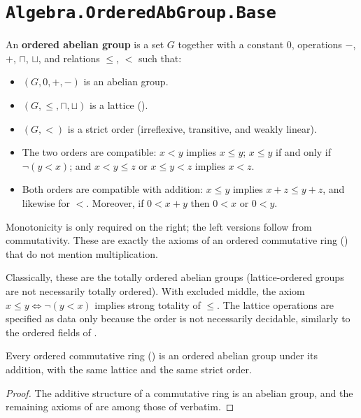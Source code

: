 \section{\texttt{Algebra.OrderedAbGroup.Base}}

\begin{definition}
  \label{IsOrderedAbGroup}
  An \textbf{ordered abelian group} is a set $G$ together with a constant $0$, operations $-$, $+$, $\sqcap$, $\sqcup$, and relations $\le$, $<$ such that:
  \begin{itemize}
  \item $(G, 0, +, -)$ is an abelian group.
  \item $(G, \le, \sqcap, \sqcup)$ is a lattice ().
  \item $(G, <)$ is a strict order (irreflexive, transitive, and weakly linear).
  \item The two orders are compatible: $x < y$ implies $x \le y$; $x \le y$ if and only if $\neg(y < x)$; and $x < y \le z$ or $x \le y < z$ implies $x < z$.
  \item Both orders are compatible with addition: $x \le y$ implies $x + z \le y + z$, and likewise for $<$. Moreover, if $0 < x + y$ then $0 < x$ or $0 < y$.
  \end{itemize}
  Monotonicity is only required on the right; the left versions follow from commutativity. These are exactly the axioms of an ordered commutative ring () that do not mention multiplication.

  Classically, these are the totally ordered abelian groups (lattice-ordered groups are not necessarily totally ordered). With excluded middle, the axiom $x \le y \iff \neg(y < x)$ implies strong totality of $\le$. The lattice operations are specified as data only because the order is not necessarily decidable, similarly to the ordered fields of \textcite[Definition 11.2.7]{univalentfoundationsprogram2013}.
\end{definition}

\begin{lemma}
  \label{OrderedCommRingToOrderedAbGroup}
  Every ordered commutative ring () is an ordered abelian group under its addition, with the same lattice and the same strict order.
\end{lemma}
\begin{proof}
  The additive structure of a commutative ring is an abelian group, and the remaining axioms of  are among those of  verbatim.
\end{proof}
